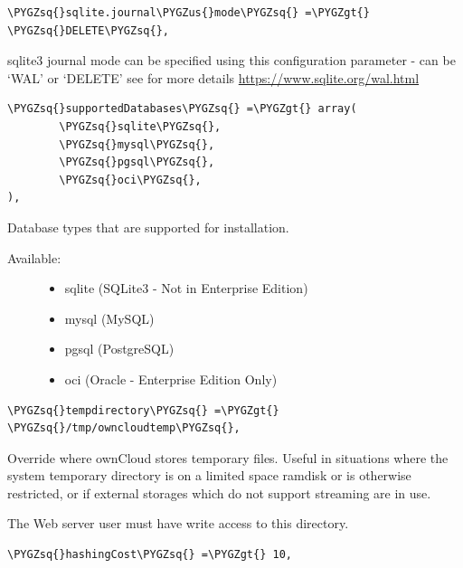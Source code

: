 \documentclass[letterpaper,10pt,english]{sphinxmanual}
\def\PYGZus{\char`\_}
\def\PYGZgt{\char`\>}
\def\PYGZsq{\char`\'}
\begin{document}
\begin{Verbatim}[commandchars=\\\{\}]
\PYGZsq{}sqlite.journal\PYGZus{}mode\PYGZsq{} =\PYGZgt{} \PYGZsq{}DELETE\PYGZsq{},
\end{Verbatim}

sqlite3 journal mode can be specified using this configuration parameter -
can be `WAL' or `DELETE' see for more details \href{https://www.sqlite.org/wal.html}{https://www.sqlite.org/wal.html}

\begin{Verbatim}[commandchars=\\\{\}]
\PYGZsq{}supportedDatabases\PYGZsq{} =\PYGZgt{} array(
        \PYGZsq{}sqlite\PYGZsq{},
        \PYGZsq{}mysql\PYGZsq{},
        \PYGZsq{}pgsql\PYGZsq{},
        \PYGZsq{}oci\PYGZsq{},
),
\end{Verbatim}

Database types that are supported for installation.
\begin{description}
\item[{Available:}] \leavevmode\begin{itemize}
\item {} 
sqlite (SQLite3 - Not in Enterprise Edition)

\item {} 
mysql (MySQL)

\item {} 
pgsql (PostgreSQL)

\item {} 
oci (Oracle - Enterprise Edition Only)

\end{itemize}

\end{description}

\begin{Verbatim}[commandchars=\\\{\}]
\PYGZsq{}tempdirectory\PYGZsq{} =\PYGZgt{} \PYGZsq{}/tmp/owncloudtemp\PYGZsq{},
\end{Verbatim}

Override where ownCloud stores temporary files. Useful in situations where
the system temporary directory is on a limited space ramdisk or is otherwise
restricted, or if external storages which do not support streaming are in
use.

The Web server user must have write access to this directory.

\begin{Verbatim}[commandchars=\\\{\}]
\PYGZsq{}hashingCost\PYGZsq{} =\PYGZgt{} 10,
\end{Verbatim}
\end{document}
